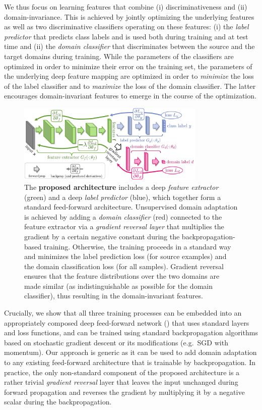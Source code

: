 We thus focus on learning features that combine (i) discriminativeness and (ii) domain-invariance. This is achieved by jointly optimizing the underlying features as well as two discriminative classifiers operating on these features: (i) the \emph{label predictor} that predicts class labels and is used both during training and at test time and (ii) the \emph{domain classifier} that discriminates between the source and the target domains during training. While the parameters of the classifiers are optimized in order to minimize their error on the training set, the parameters of the underlying deep feature mapping are optimized in order to {\em minimize} the loss of the label classifier and to {\em maximize} the loss of the domain classifier. The latter encourages domain-invariant features to emerge in the course of the optimization.

\begin{figure}

\centering
\includegraphics[width=0.8\textwidth]{figures/deepDA2.pdf}

\caption{The {\bf proposed architecture} includes a deep {\em feature extractor} (green) and a deep {\em label predictor} (blue), which together form a standard feed-forward architecture. Unsupervised domain adaptation is achieved by adding a {\em domain classifier} (red) connected to the feature extractor via a {\em gradient reversal layer} that multiplies the gradient by a certain negative constant during the backpropagation-based training. Otherwise, the training proceeds in a standard way and minimizes the label prediction loss (for source examples) and the domain classification loss (for all samples). Gradient reversal ensures that the feature distributions over the two domains are made similar (as indistinguishable as possible for the domain classifier), thus resulting in the domain-invariant features.\vspace{-2mm}}
\label{fig:arch}
\end{figure}


Crucially, we show that all three training processes can be embedded into an appropriately composed deep feed-forward network () that uses standard layers and loss functions, and can be trained using standard backpropagation algorithms based on stochastic gradient descent or its modifications (e.g.\ SGD with momentum). Our approach is generic as it can be used to add domain adaptation to any existing feed-forward architecture that is trainable by backpropagation. In practice, the only non-standard component of the proposed architecture is a rather trivial {\em gradient reversal} layer that leaves the input unchanged during forward propagation and reverses the gradient by multiplying it by a negative scalar during the backpropagation.  

